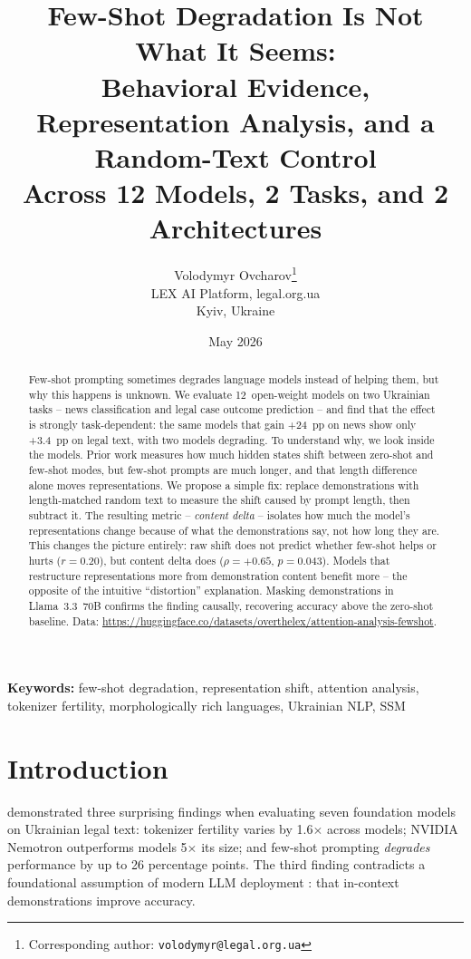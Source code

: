 \documentclass[11pt,a4paper]{article}
\title{Few-Shot Degradation Is Not What It Seems:\\
Behavioral Evidence, Representation Analysis, and a Random-Text Control\\
Across 12 Models, 2 Tasks, and 2 Architectures}
\author{
  Volodymyr Ovcharov\thanks{Corresponding author: \texttt{volodymyr@legal.org.ua}} \\
  LEX AI Platform, legal.org.ua \\
  Kyiv, Ukraine
}
\date{May 2026}
\begin{document}
\maketitle

\begin{abstract}
Few-shot prompting sometimes degrades language models instead of helping them, but why this happens is unknown. We evaluate 12~open-weight models on two Ukrainian tasks -- news classification and legal case outcome prediction -- and find that the effect is strongly task-dependent: the same models that gain +24~pp on news show only +3.4~pp on legal text, with two models degrading. To understand why, we look inside the models. Prior work measures how much hidden states shift between zero-shot and few-shot modes, but few-shot prompts are much longer, and that length difference alone moves representations. We propose a simple fix: replace demonstrations with length-matched random text to measure the shift caused by prompt length, then subtract it. The resulting metric -- \emph{content delta} -- isolates how much the model's representations change because of what the demonstrations say, not how long they are. This changes the picture entirely: raw shift does not predict whether few-shot helps or hurts ($r = 0.20$), but content delta does ($\rho = +0.65$, $p = 0.043$). Models that restructure representations more from demonstration content benefit more -- the opposite of the intuitive ``distortion'' explanation. Masking demonstrations in Llama~3.3~70B confirms the finding causally, recovering accuracy above the zero-shot baseline. Data: \url{https://huggingface.co/datasets/overthelex/attention-analysis-fewshot}.
\end{abstract}

\noindent\textbf{Keywords:} few-shot degradation, representation shift, attention analysis, tokenizer fertility, morphologically rich languages, Ukrainian NLP, SSM


\section{Introduction}

\citet{ovcharov2026tokenizer} demonstrated three surprising findings when evaluating seven foundation models on Ukrainian legal text: tokenizer fertility varies by 1.6$\times$ across models; NVIDIA Nemotron outperforms models 5$\times$ its size; and few-shot prompting \emph{degrades} performance by up to 26 percentage points. The third finding contradicts a foundational assumption of modern LLM deployment \citep{brown2020language}: that in-context demonstrations improve accuracy.
\end{document}
